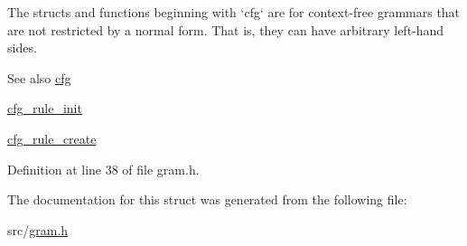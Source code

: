 \-The structs and functions beginning with `cfg` are for context-\/free grammars that are not restricted by a normal form. \-That is, they can have arbitrary left-\/hand sides.

\begin{DoxySeeAlso}{\-See also}
\hyperlink{structcfg}{cfg} 

\hyperlink{gram_8h_a956bd96a97a392e63afe06eb92c110df}{cfg\-\_\-rule\-\_\-init} 

\hyperlink{gram_8h_a5ec2c946aabf126e8d76e22894a3e63d}{cfg\-\_\-rule\-\_\-create} 
\end{DoxySeeAlso}


\-Definition at line 38 of file gram.\-h.



\-The documentation for this struct was generated from the following file\-:\begin{DoxyCompactItemize}
\item 
src/\hyperlink{gram_8h}{gram.\-h}\end{DoxyCompactItemize}

